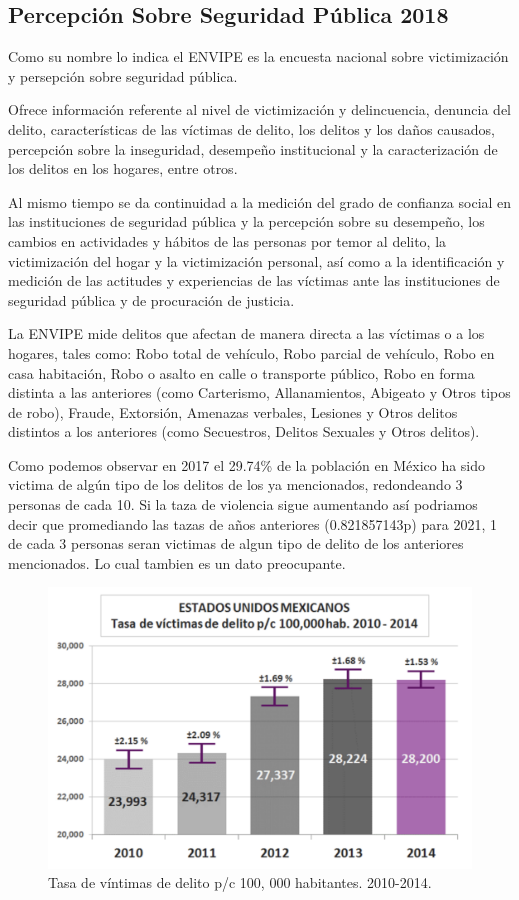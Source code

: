\subsection{Percepción Sobre Seguridad Pública 2018}

Como su nombre lo indica el ENVIPE es la encuesta nacional sobre victimización y persepción sobre seguridad pública. 

Ofrece información referente al nivel de victimización y delincuencia, denuncia del delito, características de las víctimas de delito, los delitos y los daños causados, percepción sobre la inseguridad, desempeño institucional y la caracterización de los delitos en los hogares, entre otros.

Al mismo tiempo se da continuidad a la medición del grado de confianza social en las instituciones de seguridad pública y la percepción sobre su desempeño, los cambios en actividades y hábitos de las personas por temor al delito, la victimización del hogar y la victimización personal, así como a la identificación y medición de las actitudes y experiencias de las víctimas ante las instituciones de seguridad pública y de procuración de justicia.

La ENVIPE mide delitos que afectan de manera directa a las víctimas o a los hogares, tales como: Robo total de vehículo, Robo parcial de vehículo, Robo en casa habitación, Robo o asalto en calle o transporte público, Robo en forma distinta a las anteriores (como Carterismo, Allanamientos, Abigeato y Otros tipos de robo), Fraude, Extorsión, Amenazas verbales, Lesiones y Otros delitos distintos a los anteriores (como Secuestros, Delitos Sexuales y Otros delitos). 

Como podemos observar en 2017 el 29.74\% de la población en México ha sido victima de algún tipo de los delitos de los ya mencionados, redondeando 3 personas de cada 10. Si la taza de violencia sigue aumentando así podriamos decir que promediando las tazas de años anteriores (0.821857143p) para 2021, 1 de cada 3 personas seran victimas de algun tipo de delito de los anteriores mencionados. Lo cual tambien es un dato preocupante.

\begin{figure}[bp!]
	\centering
	\includegraphics[width=5in]{imgs/envipe2010}
	  \caption{Tasa de v\'intimas de delito p/c 100, 000 habitantes. 2010-2014.}
\end{figure}

